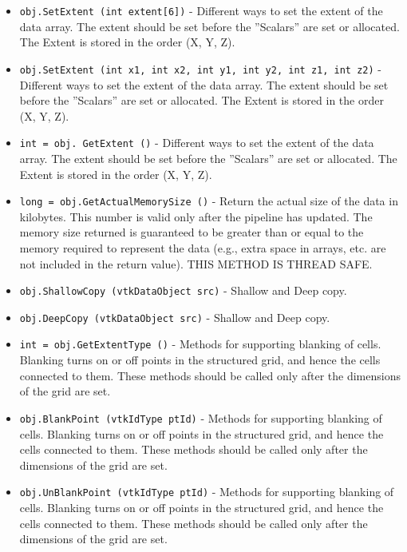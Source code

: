 \begin{itemize}
\item  \verb|obj.SetExtent (int extent[6])| -  Different ways to set the extent of the data array.  The extent
 should be set before the ''Scalars'' are set or allocated.
 The Extent is stored  in the order (X, Y, Z).

\item  \verb|obj.SetExtent (int x1, int x2, int y1, int y2, int z1, int z2)| -  Different ways to set the extent of the data array.  The extent
 should be set before the ''Scalars'' are set or allocated.
 The Extent is stored  in the order (X, Y, Z).

\item  \verb|int = obj. GetExtent ()| -  Different ways to set the extent of the data array.  The extent
 should be set before the ''Scalars'' are set or allocated.
 The Extent is stored  in the order (X, Y, Z).

\item  \verb|long = obj.GetActualMemorySize ()| -  Return the actual size of the data in kilobytes. This number
 is valid only after the pipeline has updated. The memory size
 returned is guaranteed to be greater than or equal to the
 memory required to represent the data (e.g., extra space in
 arrays, etc. are not included in the return value). THIS METHOD
 IS THREAD SAFE.

\item  \verb|obj.ShallowCopy (vtkDataObject src)| -  Shallow and Deep copy.

\item  \verb|obj.DeepCopy (vtkDataObject src)| -  Shallow and Deep copy.

\item  \verb|int = obj.GetExtentType ()| -  Methods for supporting blanking of cells. Blanking turns on or off
 points in the structured grid, and hence the cells connected to them.
 These methods should be called only after the dimensions of the
 grid are set.

\item  \verb|obj.BlankPoint (vtkIdType ptId)| -  Methods for supporting blanking of cells. Blanking turns on or off
 points in the structured grid, and hence the cells connected to them.
 These methods should be called only after the dimensions of the
 grid are set.

\item  \verb|obj.UnBlankPoint (vtkIdType ptId)| -  Methods for supporting blanking of cells. Blanking turns on or off
 points in the structured grid, and hence the cells connected to them.
 These methods should be called only after the dimensions of the
 grid are set.


\end{itemize}
